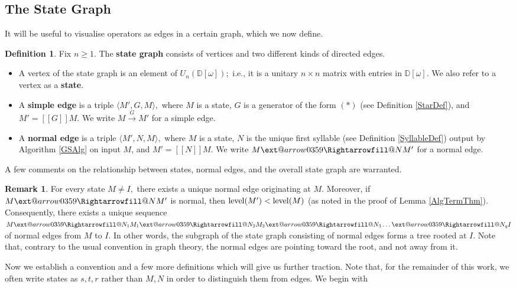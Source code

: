 \documentclass{dalthesis}
\makeatletter
\theoremstyle{theorem}
\theoremstyle{definition}
\newtheorem{definition}[theorem]{Definition}
\theoremstyle{definition}  %
\newtheorem{remark}[theorem]{Remark}
\theoremstyle{definition}
\newcommand{\D}{\mathbb{D}}
\newcommand{\sem}[1]{[\![#1]\!]}
\renewcommand{\:}{\mathbin{:}}
\newcommand{\xRightarrow}[2][]{\ext@arrow
  0359\Rightarrowfill@{#1}{#2}}
\newcommand{\level}{\mathop{\rm level}\nolimits}
\newcommand{\edge}{\xrightarrow}
\newcommand{\nedge}{\xRightarrow}
\makeatother
\begin{document}
\subsection{The State Graph}

It will be useful to visualise operators as edges in a certain graph, which we now define.

\begin{definition}
\label{StateGraphDef}
Fix $n\geq 1.$ The \textbf{state graph} consists of vertices and two different kinds of directed edges.
\begin{itemize}
\item A vertex of the state graph is an element of $U_n(\D[\omega]);$ i.e., it is a unitary $n\times n$ matrix with entries in $\D[\omega].$ We also refer to a vertex as a \textbf{state}.

\item A \textbf{simple edge} is a triple $\langle M', G, M\rangle,$ where $M$ is a state, $G$ is a generator of the form $(*)$ (see Definition \ref{StarDef}), and $M' = \sem{G}M.$ We write $M\edge{G}M'$ for a simple edge.

\item A \textbf{normal edge} is a triple $\langle M', N, M \rangle,$ where $M$ is a state, $N$ is the unique first syllable (see Definition \ref{SyllableDef}) output by Algorithm \ref{GSAlg} on input $M$, and $M' = \sem{N}M.$ We write $M\nedge{N}M'$ for a normal edge.
\end{itemize}
\end{definition}

A few comments on the relationship between states, normal edges, and the overall state graph are warranted.

\begin{remark}
\label{NormUniqueRemark}
For every state $M\neq I,$ there exists a unique normal edge originating at $M.$ Moreover, if $M\nedge{N}M'$ is normal, then $\level(M')<\level(M)$ (as noted in the proof of Lemma \ref{AlgTermThm}). Consequently, there exists a unique sequence $M\nedge{N_1}M_1\nedge{N_2}M_2\nedge{N_3}\ldots \nedge{N_q}I$ of normal edges from $M$ to $I.$ In other words, the subgraph of the state graph consisting of normal edges forms a tree rooted at $I.$ Note that, contrary to the usual convention in graph theory, the normal edges are pointing toward the root, and not away from it.
\end{remark}

Now we establish a convention and a few more definitions which will give us further traction. Note that, for the remainder of this work, we often write states as $s,t,r$ rather than $M,N$ in order to distinguish them from edges. We begin with
\end{document}
